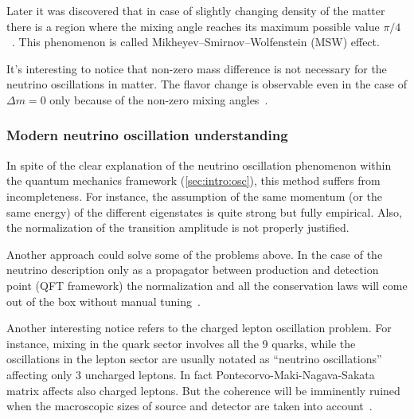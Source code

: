 \documentclass[../main.tex]{subfiles}
\begin{document}
Later it was discovered that in case of slightly changing density of the matter there is a region where the mixing angle reaches its maximum possible value $\pi/4$~\cite{Mikheyev1985}. This phenomenon is called Mikheyev–Smirnov–Wolfenstein (MSW) effect.

It's interesting to notice that non-zero mass difference is not necessary for the neutrino oscillations in matter. The flavor change is observable even in the case of $\Delta m=0$ only because of the non-zero mixing angles~\cite{Smirnov2016}.


\subsubsection{Modern neutrino oscillation understanding}
In spite of the clear explanation of the neutrino oscillation phenomenon within the quantum mechanics framework (\autoref{sec:intro:osc}), this method suffers from incompleteness. For instance, the assumption of the same momentum (or the same energy) of the different eigenstates is quite strong but fully empirical. Also, the normalization of the transition amplitude is not properly justified.

Another approach could solve some of the problems above. In the case of the neutrino description only as a propagator between production and detection point (QFT framework) the normalization and all the conservation laws will come out of the box without manual tuning~\cite{Akhmedov2010a}.

Another interesting notice refers to the charged lepton oscillation problem. For instance, mixing in the quark sector involves all the 9 quarks, while the oscillations in the lepton sector are usually notated as ``neutrino oscillations'' affecting only 3 uncharged leptons. In fact Pontecorvo-Maki-Nagava-Sakata matrix affects also charged leptons. But the coherence will be imminently ruined when the macroscopic sizes of source and detector are taken into account~\cite{Akhmedov2007}.
\end{document}
